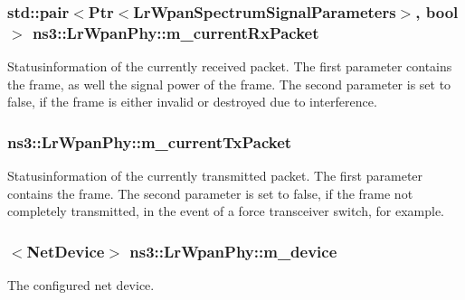 \subsubsection[{\texorpdfstring{m\+\_\+current\+Rx\+Packet}{m_currentRxPacket}}]{\setlength{\rightskip}{0pt plus 5cm}std\+::pair$<${\bf Ptr}$<${\bf Lr\+Wpan\+Spectrum\+Signal\+Parameters}$>$, bool$>$ ns3\+::\+Lr\+Wpan\+Phy\+::m\+\_\+current\+Rx\+Packet\hspace{0.3cm}{\ttfamily [private]}}\hypertarget{classns3_1_1LrWpanPhy_a5e25bc6b183652edc17015d04cca92a3}{}\label{classns3_1_1LrWpanPhy_a5e25bc6b183652edc17015d04cca92a3}
Statusinformation of the currently received packet. The first parameter contains the frame, as well the signal power of the frame. The second parameter is set to false, if the frame is either invalid or destroyed due to interference. 
\subsubsection[{\texorpdfstring{m\+\_\+current\+Tx\+Packet}{m_currentTxPacket}}]{ ns3\+::\+Lr\+Wpan\+Phy\+::m\+\_\+current\+Tx\+Packet\hspace{0.3cm}{\ttfamily [private]}}\hypertarget{classns3_1_1LrWpanPhy_a695601152abac951fa1958d826813082}{}\label{classns3_1_1LrWpanPhy_a695601152abac951fa1958d826813082}
Statusinformation of the currently transmitted packet. The first parameter contains the frame. The second parameter is set to false, if the frame not completely transmitted, in the event of a force transceiver switch, for example. 
\subsubsection[{\texorpdfstring{m\+\_\+device}{m_device}}]{$<${\bf Net\+Device}$>$ ns3\+::\+Lr\+Wpan\+Phy\+::m\+\_\+device\hspace{0.3cm}{\ttfamily [private]}}\hypertarget{classns3_1_1LrWpanPhy_a406001d3cb4da3828837c1c1b4629a9c}{}\label{classns3_1_1LrWpanPhy_a406001d3cb4da3828837c1c1b4629a9c}
The configured net device. 

